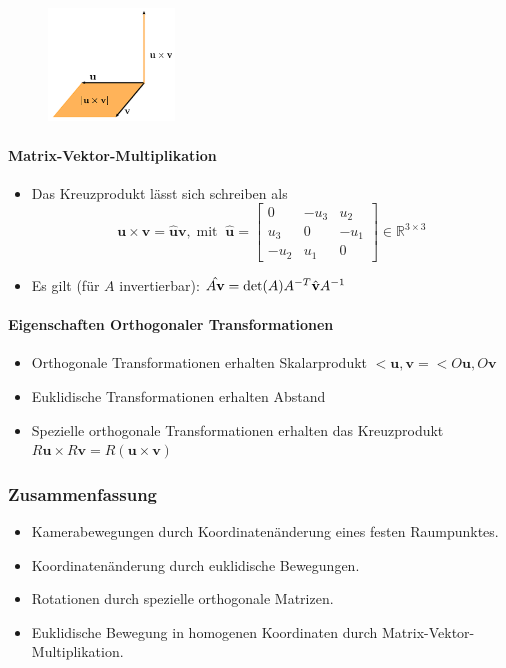 \documentclass[12pt, a4paper, oneside]{article}
\begin{document}
\begin{figure}[!h]
    \centering
    \includegraphics[width=0.3\textwidth]{../img/2-10.png}
    \label{img/2-10}
\end{figure}

\paragraph*{Matrix-Vektor-Multiplikation}

\begin{itemize}
    \item Das Kreuzprodukt lässt sich schreiben als
    $$
    \mathbf{u}\times\mathbf{v} = \hat{\mathbf{u}}\mathbf{v},\;\text{mit}\;\; \hat{\mathbf{u}} = 
    \begin{bmatrix}
        0 & -u_3 & u_2 \\
        u_3 & 0 & -u_1 \\
        -u_2 & u_1 & 0
    \end{bmatrix}\in \mathbb{R}^{3\times 3}
    $$
    \item Es gilt (für $A$ invertierbar): $\Hat{A\mathbf{v}} = \det (A)A^{-T}\hat{\mathbf{v}}A^{-1}$
\end{itemize}

\paragraph*{Eigenschaften Orthogonaler Transformationen}

\begin{itemize}
    \item Orthogonale Transformationen erhalten Skalarprodukt $<\mathbf{u,v} = <O\mathbf{u},O\mathbf{v}$
    \item Euklidische Transformationen erhalten Abstand
    \item Spezielle orthogonale Transformationen erhalten das Kreuzprodukt $R\mathbf{u}\times R\mathbf{v} = R(\mathbf{u}\times \mathbf{v})$
\end{itemize}

\subsubsection{Zusammenfassung}

\begin{itemize}
    \item Kamerabewegungen durch Koordinatenänderung eines festen Raumpunktes.
    \item Koordinatenänderung durch euklidische Bewegungen.
    \item Rotationen durch spezielle orthogonale Matrizen.
    \item Euklidische Bewegung in homogenen Koordinaten durch Matrix-Vektor-Multiplikation.
\end{itemize}
\end{document}
